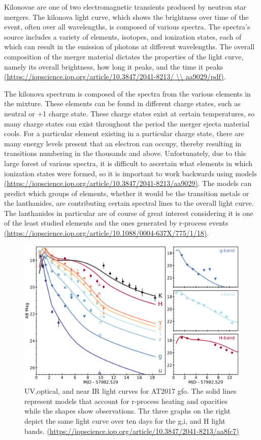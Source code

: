 \documentclass[11pt,a4paper]{article}
\begin{document}
Kilonovae are one of two electromagnetic transients produced by neutron star mergers. The kilonova light curve, which shows the brightness over time of the event, often over all wavelengths, is composed of various spectra. The spectra's source includes a variety of elements, isotopes, and ionization states, each of which can result in the emission of photons at different wavelengths. The overall composition of the merger material dictates the properties of the light curve, namely its overall brightness, how long it peaks, and the time it peaks \url{(https://iopscience.iop.org/article/10.3847/2041-8213/ \\ aa9029/pdf)}.

The kilonova spectrum is composed of the spectra from the various elements in the mixture. These elements can be found in different charge states, such as neutral or +1 charge state. These charge states exist at certain temperatures, so many charge states can exist throughout the period the merger ejecta material cools. For a particular element existing in a particular charge state, there are many energy levels present that an electron can occupy, thereby resulting in transitions numbering in the thousands and above.
Unfortunately, due to this large forest of various spectra, it is difficult to ascertain what elements in which ionization states were formed, so it is important to work backwards using models  \url{(https://iopscience.iop.org/article/10.3847/2041-8213/aa9029)}. The models can predict which groups of elements, whether it would be the transition metals or the lanthanides, are contributing certain spectral lines to the overall light curve. The lanthanides in particular are of course of great interest considering it is one of the least studied elements and the ones generated by r-process events \url{(https://iopscience.iop.org/article/10.1088/0004-637X/775/1/18)}.

\begin{figure}[h!]
  \includegraphics[width=1\textwidth]{light_curve.png}
  \caption{UV,optical, and near IR light curves for AT2017 gfo. The solid lines represent models that account for r-process heating and opacities while the shapes show observations. Thr three graphs on the right depict the same light curve over ten days for the g,i, and H light bands. \url{(https://iopscience.iop.org/article/10.3847/2041-8213/aa8fc7)} }
\end{figure}
\end{document}
